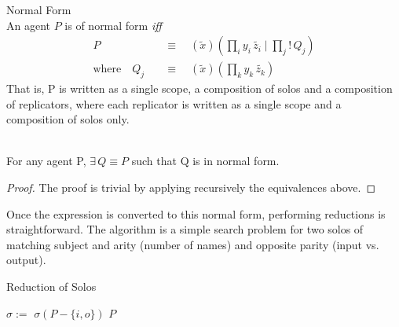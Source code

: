         \begin{definition}{Normal Form\\}
            An agent $P$ is of normal form \textit{iff}
            \begin{align*}
                                    P \quad &\equiv \quad (\tilde{x})(\prod_{i}{y_i \, \tilde{z_i}} \; | \; \prod_{j}{! \, Q_j}) \\
                \text{where} \quad Q_j \quad &\equiv \quad (\tilde{x})(\prod_{k}{y_k \, \tilde{z_k}})
            \end{align*}
            That is, P is written as a single scope, a composition of solos and a composition of replicators, where each replicator is written as a single scope and a composition of solos only.
        \end{definition}

        \begin{lemma}{~\\}
            For any agent P, $\exists \, Q \equiv P$ such that Q is in normal form.
            \begin{proof}
                The proof is trivial by applying recursively the equivalences above.
            \end{proof}
        \end{lemma}

        Once the expression is converted to this normal form, performing reductions is straightforward.
        The algorithm is a simple search problem for two solos of matching subject and arity (number of names) and opposite parity (input vs. output).
        
        \begin{breakablealgorithm}
            \caption{Reduction of Solos}
            \begin{algorithmic}[1]
                     
                         
                             
                                \State$\sigma :=$ 
                                    \State\Return$\sigma(P - \{i, o\})$
                                \EndIf
                            \EndIf
                        \EndFor
                    \EndFor
                    \State\Return$P$
                \EndFunction
            \end{algorithmic}
        \end{breakablealgorithm}

